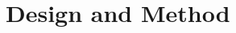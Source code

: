 \documentclass[preprint2,numberedappendix,tighten,twocolappendix]{aastex6}
\begin{document}



\section{Design and Method}

\end{document}
